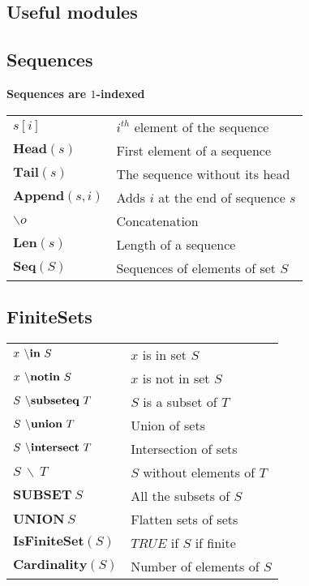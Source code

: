 \documentclass[10pt,landscape]{article}
\begin{document}
\begin{multicols}{3}
{    \section{Useful modules}

    \subsection{Sequences}
 
    \textbf{Sequences are $1$-indexed}
    
    \begin{tabular}{p{}|p{}}
      $s[i]$ & $i^{th}$ element of the sequence\\ 
      $\textbf{Head}(s)$ & First element of a sequence\\
      $\textbf{Tail}(s)$ & The sequence without its head\\
      $\textbf{Append}(s, i)$ & Adds $i$ at the end of sequence $s$\\
      $\backslash o$ & Concatenation \\
      $\textbf{Len}(s)$ & Length of a sequence \\
      $\textbf{Seq}(S)$ & Sequences of elements of set $S$\\
    \end{tabular}

    \subsection{FiniteSets}
    
    \begin{tabular}{p{}|p{}}
      $x \textbf{$~\backslash$in}~S$ & $x$ is in set $S$\\
      $x \textbf{$~\backslash$notin}~S$ & $x$ is not in set $S$\\
      $S \textbf{$~\backslash$subseteq}~T$ & $S$ is a subset of $T$\\
      $S \textbf{$~\backslash$union}~T$ & Union of sets\\
      $S \textbf{$~\backslash$intersect}~T$ & Intersection of sets\\
      $S~\backslash~T$ & $S$ without elements of $T$\\
      $\textbf{SUBSET}~S$ & All the subsets of $S$\\
      $\textbf{UNION}~S$ & Flatten sets of sets\\
      $\textbf{IsFiniteSet}(S)$ & $TRUE$ if $S$ if finite\\
      $\textbf{Cardinality}(S)$ & Number of elements of $S$
    \end{tabular}

}
\end{multicols}
\end{document}
